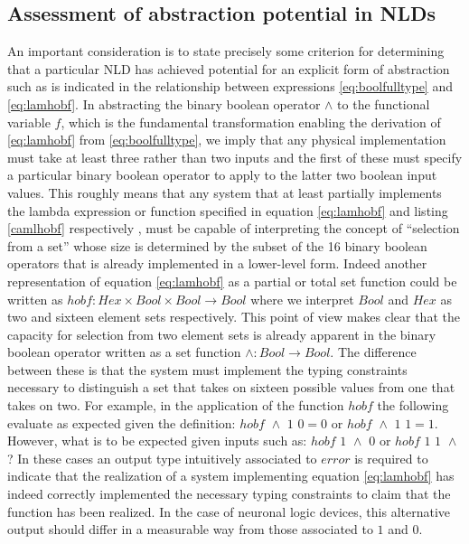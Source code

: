 \subsection{Assessment of abstraction potential in NLDs}
An important consideration is to state precisely some criterion for
determining that a particular NLD has achieved potential for an explicit
form of abstraction such as is indicated in the relationship between
expressions \ref{eq:boolfulltype} and
\ref{eq:lamhobf}. In abstracting the binary boolean
operator $\wedge$ to the functional variable
$f$, which is the fundamental
transformation enabling the derivation of
\ref{eq:lamhobf} from
\ref{eq:boolfulltype}, we imply that any physical
implementation must take at least three rather than two inputs and the
first of these must specify a particular binary boolean operator to
apply to the latter two boolean input values. This roughly means that
any system that at least partially implements the lambda expression or
function specified in equation \ref{eq:lamhobf} and
listing \ref{camlhobf} respectively , must be capable of
interpreting the concept of ``selection from a set'' whose size is
determined by the subset of the 16 binary boolean operators that is
already implemented in a lower-level form. Indeed another representation
of equation \ref{eq:lamhobf} as a partial or total
set function could be written as $hobf : Hex \times Bool \times Bool \rightarrow Bool$
where we interpret $Bool$ and
$Hex$ as two and sixteen element sets
respectively. This point of view makes clear that the capacity for
selection from two element sets is already apparent in the binary
boolean operator written as a set function
$\wedge : Bool \rightarrow Bool$. The difference between these is
that the system must implement the typing constraints necessary to
distinguish a set that takes on sixteen possible values from one that
takes on two. For example, in the application of the function
$hobf$ the following evaluate as expected
given the definition: $hobf \,\, \wedge \,\, 1\,\, 0=0$ or
$hobf \,\, \wedge \,\, 1\,\, 1=1$. However, what is to be expected
given inputs such as: $hobf \,\, 1 \,\, \wedge\,\, 0$ or
$hobf \,\, 1 \,\, 1\,\, \wedge$? In these cases an output type
intuitively associated to $error$ is
required to indicate that the realization of a system implementing
equation \ref{eq:lamhobf} has indeed correctly
implemented the necessary typing constraints to claim that the function
has been realized. In the case of neuronal logic devices, this
alternative output should differ in a measurable way from those
associated to $1$ and $0$.


